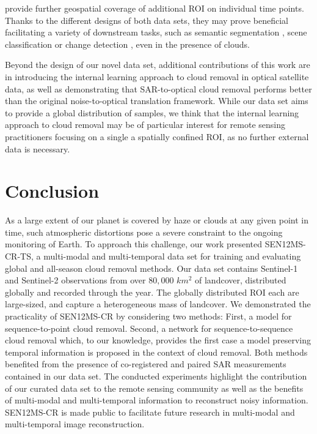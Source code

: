 \documentclass[journal]{IEEEtran}
\begin{document}
provide further geospatial coverage of additional ROI on individual time points. Thanks to the different designs of both data sets, they may prove beneficial facilitating a variety of downstream tasks, such as semantic segmentation \cite{schmitt2019sen12ms}, scene classification \cite{schmitt2021remote} or change detection \cite{ebel2021fusing}, even in the presence of clouds.

Beyond the design of our novel data set, additional contributions of this work are in introducing the internal learning approach to cloud removal in optical satellite data, as well as demonstrating that SAR-to-optical cloud removal performs better than the original noise-to-optical translation framework. While our data set aims to provide a global distribution of samples, we think that the internal learning approach to cloud removal may be of particular interest for remote sensing practitioners focusing on a single a spatially confined ROI, as no further external data is necessary. 

\section{Conclusion} \label{conclusion}

As a large extent of our planet is covered by haze or clouds at any given point in time, such atmospheric distortions pose a severe constraint to the ongoing monitoring of Earth. To approach this challenge, our work presented SEN12MS-CR-TS, a multi-modal and multi-temporal data set for training and evaluating global and all-season cloud removal methods. Our data set contains Sentinel-1 and Sentinel-2 observations from over $80,000$ $km^2$ of landcover, distributed globally and recorded through the year. The globally distributed ROI each are large-sized, and capture a heterogeneous mass of landcover. We demonstrated the practicality of SEN12MS-CR by considering two methods: First, a model for sequence-to-point cloud removal. Second, a network for sequence-to-sequence cloud removal which, to our knowledge, provides the first case a model preserving temporal information is proposed in the context of cloud removal. Both methods benefited from the presence of co-registered and paired SAR measurements contained in our data set. The conducted experiments highlight the contribution of our curated data set to the remote sensing community as well as the benefits of multi-modal and multi-temporal information to reconstruct noisy information. SEN12MS-CR is made public to facilitate future research in multi-modal and multi-temporal image reconstruction.
\end{document}
